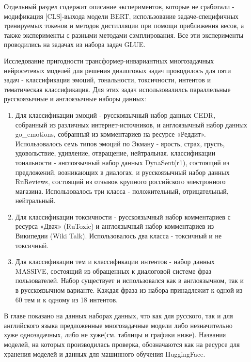 Отдельный раздел содержит описание экспериментов, которые не сработали - модификация [CLS]-выхода модели BERT, использование задаче-специфичных тренируемых токенов и методов дистилляции при помощи приближения весов, а также эксперименты с разными методами сэмплирования. Все эти эксперименты проводились на задачах из набора задач GLUE.

Исследование пригодности трансформер-инвариантных многозадачных нейросетевых моделей для решения диалоговых задач проводилось для пяти задач - классификация эмоций, тональности, токсичности, интентов и тематическая классификация. Для этих задач использовалилсь параллельные русскоязычные и англоязычные наборы данных:
\begin{enumerate}
    \item Для классификации эмоций - русскоязычный набор данных CEDR, собранный из различных интернет-источников, и англоязычный набор данных go\_emotions, собранный из комментариев на ресурсе «Реддит». Использовалось семь типов эмоций по Экману - ярость, страх, грусть, удовольствие, удивление, отвращение, нейтральная.
     классификации тональности - англоязычный набор данных DynaSent(r1), состоящий из предложений, возникающих в диалогах, и русскоязычный набор данных RuReviews, состоящий из отзывов крупного российского электронного магазина. Использовалось три класса - положительный, отрицательный, нейтральный.
    \item Для классификации токсичности - русскоязычный набор комментариев с ресурса «Двач» (RuToxic) и англоязычный набор комментариев из Википедии (Wiki Talk). Использовалось два класса - токсичный и не токсичный.
    \item Для классификации тем и классификации интентов - набор данных MASSIVE, состоящий из обращенных к диалоговой системе фраз пользователей. Набор существует и использовался как в англоязычном, так и в русскоязычном варианте. Каждая фраза из набора принадлежит к одной из 60 тем и к одному из 18 интентов.
    
\end{enumerate}

В главе показано на данных наборах данных, что как для русского, так и для английского языка предложенные многозадачные модели либо незначительно хуже однозадачных, либо не хуже(см. таблицы и графики ниже). Названия моделей, на которых производилась проверка, обозначаются как на ресурсе для хранения моделей и данных для машинного обучения HuggingFace.

